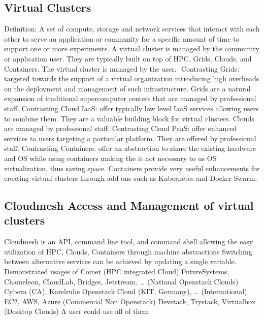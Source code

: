 \subsection{Virtual Clusters}
Definition: A set of compute, storage and network services that interact with each other to serve an application or community for a specific amount of time to support one or more experiments. A virtual cluster is managed by the community or application user. They are typically built on top of HPC, Grids, Clouds, and Containers. The virtual cluster is managed by the user. 
Contrasting Grids: targeted towards the support of a virtual organization introducing high overheads on the deployment and management of such infrastructure. Grids are a natural expansion of traditional supercomputer centers that are managed by professional staff.
Contrasting Cloud IaaS: offer typically low level IaaS services allowing users to combine them. They are a valuable building block for virtual clusters. Clouds are managed by professional staff.
Contrasting Cloud PaaS: offer enhanced services to users targeting a particular platform. They are offered by professional staff.
Contrasting Containers: offer an abstraction to share the existing hardware and OS while using containers making the it not necessary to us OS virtualization, thus saving space. Containers provide very useful enhancements for creating virtual clusters through add ons such as Kubernetes and Docker Swarm.



\subsection{Cloudmesh Access and Management of virtual clusters}
Cloudmesh is an API, command line tool, and command shell allowing the easy utilization of HPC, Clouds, Containers through machine abstractions
Switching between alternative services can be achieved by updating a single variable.  
Demonstrated usages of
Comet                                                                                           (HPC integrated Cloud)
FutureSystems, Chameleon, CloudLab, Bridges, Jetstream, …  (National Openstack Clouds)
Cybera (CA), Karslruhe Openstack Cloud (KIT, Germany), …     (International)
EC2, AWS, Azure                                                                          (Commercial Non Openstack)
Devstack, Trystack, Virtualbox                                                       (Desktop Clouds)
A user could use all of them

